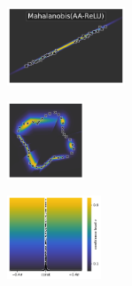 \begin{figure}[H]
    \centering
    \begin{subfigure}
        \centering
        \includegraphics[width=0.388\textwidth,valign=t]{ood-detection/figures/ood-detection/confidence-line-aa-relu-mahalanobis.pdf}
    \end{subfigure}
    \begin{subfigure}
        \centering
        \includegraphics[width=0.254\textwidth,valign=t]{ood-detection/figures/ood-detection/confidence-circle-aa-relu-mahalanobis.pdf}
    \end{subfigure}
    \begin{subfigure}
        \centering
        \includegraphics[width=0.308\textwidth,valign=t]{ood-detection/figures/ood-detection/confidence-haystack-aa-relu-mahalanobis.pdf}
    \end{subfigure}


\end{figure}
